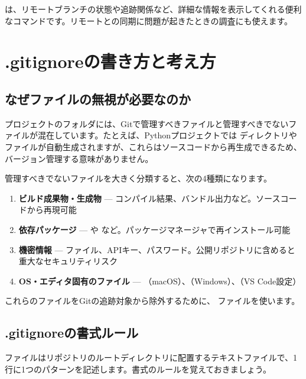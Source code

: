  は、リモートブランチの状態や追跡関係など、詳細な情報を表示してくれる便利なコマンドです。リモートとの同期に問題が起きたときの調査にも使えます。

\section{.gitignoreの書き方と考え方}

\subsection{なぜファイルの無視が必要なのか}

プロジェクトのフォルダには、Gitで管理すべきファイルと管理すべきでないファイルが混在しています。たとえば、Pythonプロジェクトでは  ディレクトリや  ファイルが自動生成されますが、これらはソースコードから再生成できるため、バージョン管理する意味がありません。

管理すべきでないファイルを大きく分類すると、次の4種類になります。

\begin{enumerate}
  \item \textbf{ビルド成果物・生成物} — コンパイル結果、バンドル出力など。ソースコードから再現可能
  \item \textbf{依存パッケージ} —  や  など。パッケージマネージャで再インストール可能
  \item \textbf{機密情報} —  ファイル、APIキー、パスワード。公開リポジトリに含めると重大なセキュリティリスク
  \item \textbf{OS・エディタ固有のファイル} — （macOS）、（Windows）、（VS Code設定）
\end{enumerate}

これらのファイルをGitの追跡対象から除外するために、 ファイルを使います。

\subsection{.gitignoreの書式ルール}

 ファイルはリポジトリのルートディレクトリに配置するテキストファイルで、1行に1つのパターンを記述します。書式のルールを覚えておきましょう。


